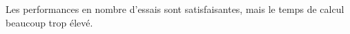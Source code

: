 
Les performances en nombre d'essais sont satisfaisantes, mais le temps de calcul beaucoup trop élevé. 

 

